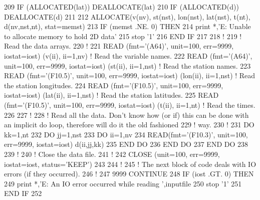 \begin{DoxyCode}
209     \textcolor{keywordflow}{IF} (\textcolor{keyword}{ALLOCATED}(lat)) \textcolor{keyword}{DEALLOCATE}(lat)
210     \textcolor{keywordflow}{IF} (\textcolor{keyword}{ALLOCATED}(d))   \textcolor{keyword}{DEALLOCATE}(d)
211 
212     \textcolor{keyword}{ALLOCATE}(v(nv), st(nst), lon(nst), lat(nst), t(nt), d(nv,nst,nt), stat=memst)
213     \textcolor{keywordflow}{IF} (memst .NE. 0) \textcolor{keywordflow}{THEN}
214         print *,\textcolor{stringliteral}{'E: Unable to allocate memory to hold 2D data'}
215         stop \textcolor{stringliteral}{'1'}
216 \textcolor{keywordflow}{    END IF}
217 
218     \textcolor{comment}{!}
219     \textcolor{comment}{! Read the data arrays.}
220     \textcolor{comment}{!}
221     \textcolor{keyword}{READ} (fmt=\textcolor{stringliteral}{'(A64)'}, unit=100, err=9999, iostat=iost) (v(ii), ii=1,nv)       \textcolor{comment}{! Read the variable names.}
222     \textcolor{keyword}{READ} (fmt=\textcolor{stringliteral}{'(A64)'}, unit=100, err=9999, iostat=iost) (st(ii), ii=1,nst)     \textcolor{comment}{! Read the station names.}
223     \textcolor{keyword}{READ} (fmt=\textcolor{stringliteral}{'(F10.5)'}, unit=100, err=9999, iostat=iost) (lon(ii), ii=1,nst)  \textcolor{comment}{! Read the station
       longitudes.}
224     \textcolor{keyword}{READ} (fmt=\textcolor{stringliteral}{'(F10.5)'}, unit=100, err=9999, iostat=iost) (lat(ii), ii=1,nst)  \textcolor{comment}{! Read the station
       latitudes.}
225     \textcolor{keyword}{READ} (fmt=\textcolor{stringliteral}{'(F10.5)'}, unit=100, err=9999, iostat=iost) (t(ii), ii=1,nt)     \textcolor{comment}{! Read the times.}
226 
227     \textcolor{comment}{!}
228     \textcolor{comment}{! Read all the data. Don't know how (or if) this can be done with an implicit do loop, therefore will
       do it the old fashioned}
229     \textcolor{comment}{! way.}
230     \textcolor{comment}{!}
231     \textcolor{keywordflow}{DO} kk=1,nt
232         \textcolor{keywordflow}{DO} jj=1,nst
233             \textcolor{keywordflow}{DO} ii=1,nv
234                 \textcolor{keyword}{READ}(fmt=\textcolor{stringliteral}{'(F10.3)'}, unit=100, err=9999, iostat=iost) d(ii,jj,kk)
235 \textcolor{keywordflow}{            END DO}
236 \textcolor{keywordflow}{        END DO}
237 \textcolor{keywordflow}{    END DO}
238 
239     \textcolor{comment}{!}
240     \textcolor{comment}{! Close the data file.}
241     \textcolor{comment}{!}
242     \textcolor{keyword}{CLOSE} (unit=100, err=9999, iostat=iost, status=\textcolor{stringliteral}{'KEEP'})
243 
244     \textcolor{comment}{!}
245     \textcolor{comment}{! The next block of code deals with IO errors (if they occurred).}
246     \textcolor{comment}{!}
247     9999 \textcolor{keywordflow}{CONTINUE}
248     \textcolor{keywordflow}{IF} (iost .GT. 0) \textcolor{keywordflow}{THEN}
249         print *,\textcolor{stringliteral}{'E: An IO error occurred while reading '},inputfile
250         stop \textcolor{stringliteral}{'1'}
251 \textcolor{keywordflow}{    END IF}
252 
\end{DoxyCode}


